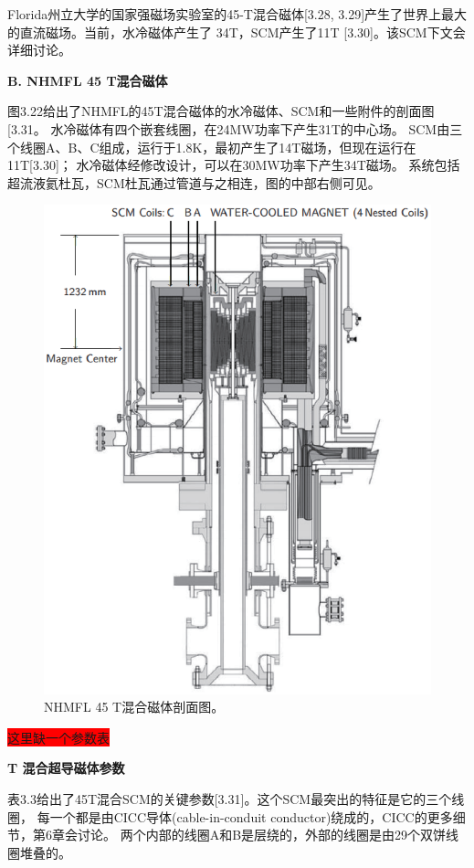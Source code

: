 Florida州立大学的国家强磁场实验室的45-T混合磁体[3.28, 3.29]产生了世界上最大的直流磁场。当前，水冷磁体产生了
34T，SCM产生了11T [3.30]。该SCM下文会详细讨论。

\textbf{B. NHMFL 45 T混合磁体}

图3.22给出了NHMFL的45T混合磁体的水冷磁体、SCM和一些附件的剖面图[3.31。
水冷磁体有四个嵌套线圈，在24MW功率下产生31T的中心场。
SCM由三个线圈A、B、C组成，运行于1.8K，最初产生了14T磁场，但现在运行在11T[3.30]；
水冷磁体经修改设计，可以在30MW功率下产生34T磁场。
系统包括超流液氦杜瓦，SCM杜瓦通过管道与之相连，图的中部右侧可见。
\begin{figure}[htbp]
	\centering
	\includegraphics[scale=0.7]{chpt3/figs/fig3.22.eps}
	\caption{NHMFL 45 T混合磁体剖面图。}
\end{figure}

\colorbox{red}{这里缺一个参数表}

\textbf{ T 混合超导磁体参数}

表3.3给出了45T混合SCM的关键参数[3.31]。这个SCM最突出的特征是它的三个线圈，
每一个都是由CICC导体(cable-in-conduit conductor)绕成的，CICC的更多细节，第6章会讨论。
两个内部的线圈A和B是层绕的，外部的线圈是由29个双饼线圈堆叠的。

